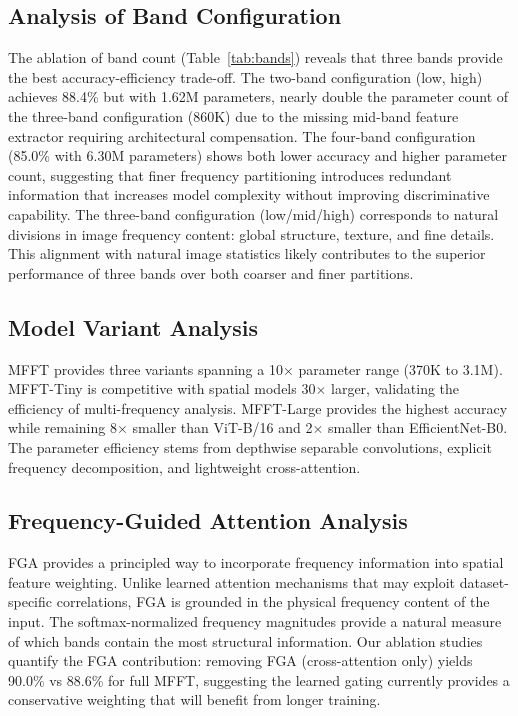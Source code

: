\documentclass[journal]{IEEEtran}
\begin{document}
\subsection{Analysis of Band Configuration}
The ablation of band count (Table~\ref{tab:bands}) reveals that three bands provide the best accuracy-efficiency trade-off. The two-band configuration (low, high) achieves 88.4\% but with 1.62M parameters, nearly double the parameter count of the three-band configuration (860K) due to the missing mid-band feature extractor requiring architectural compensation. The four-band configuration (85.0\% with 6.30M parameters) shows both lower accuracy and higher parameter count, suggesting that finer frequency partitioning introduces redundant information that increases model complexity without improving discriminative capability. The three-band configuration (low/mid/high) corresponds to natural divisions in image frequency content: global structure, texture, and fine details. This alignment with natural image statistics likely contributes to the superior performance of three bands over both coarser and finer partitions.

\subsection{Model Variant Analysis}
MFFT provides three variants spanning a 10$\times$ parameter range (370K to 3.1M). MFFT-Tiny is competitive with spatial models 30$\times$ larger, validating the efficiency of multi-frequency analysis. MFFT-Large provides the highest accuracy while remaining 8$\times$ smaller than ViT-B/16 and 2$\times$ smaller than EfficientNet-B0. The parameter efficiency stems from depthwise separable convolutions, explicit frequency decomposition, and lightweight cross-attention.

\subsection{Frequency-Guided Attention Analysis}
FGA provides a principled way to incorporate frequency information into spatial feature weighting. Unlike learned attention mechanisms that may exploit dataset-specific correlations, FGA is grounded in the physical frequency content of the input. The softmax-normalized frequency magnitudes provide a natural measure of which bands contain the most structural information. Our ablation studies quantify the FGA contribution: removing FGA (cross-attention only) yields 90.0\% vs 88.6\% for full MFFT, suggesting the learned gating currently provides a conservative weighting that will benefit from longer training.
\end{document}
